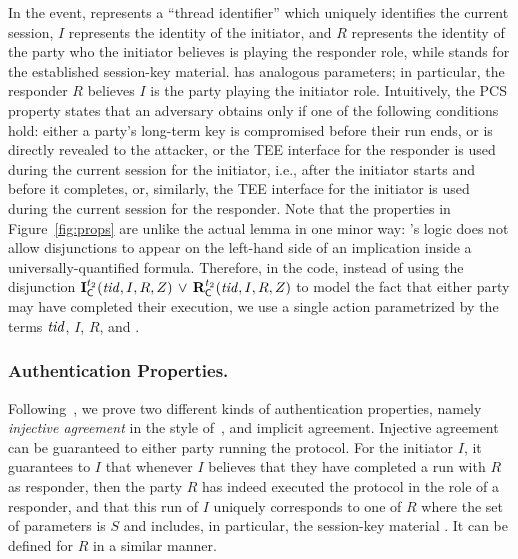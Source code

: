 \documentclass[runningheads]{llncs}
\begin{document}
In the \mIComplete{} event, \mTID{} represents a ``thread identifier'' which uniquely identifies the
current session, $I$ represents the identity of the initiator,
and $R$ represents the identity of the party who the initiator believes is
playing the responder role, while \mSessKey{} stands for the established
session-key material.
%
\mRComplete{} has analogous parameters; in particular, the responder $R$
believes $I$ is the party playing the initiator role.
%
Intuitively, the PCS property states that an adversary obtains \mSessKey{}
only if one of the following conditions hold: either a party's long-term key
is compromised before their run ends, or \mSessKey{} is directly revealed to
the attacker, or the TEE interface for the responder is used during the current
session for the initiator, i.e., after the initiator starts and before it
completes, or, similarly, the TEE interface for the initiator is used during the
current session for the responder.
%
Note that the properties in Figure~\ref{fig:props} are unlike the actual \mTamarin{} lemma in one minor way: \mTamarin's logic does not allow disjunctions to appear on
the left-hand side of an implication inside a universally-quantified formula.
%
Therefore, in the \mTamarin{} code, instead of using the disjunction
$\mathbf{I}_{\textsf{C}}^{t_2}(\mathit{tid}, I, R, Z)\, \lor\,
\mathbf{R}_{\textsf{C}}^{t_2}(\mathit{tid}, I, R, Z)$
to model the fact that either party may have completed their execution, we use
a single action parametrized by the terms $\mathit{tid}$, $I$, $R$, and \mSessKey.

\subsubsection{Authentication Properties.}
\label{sec:authenticationDef}
Following~\cite{Norr21}, we prove two different kinds of authentication
properties, namely \emph{injective agreement} in the style
of~\cite{DBLP:conf/csfw/Lowe97a}, and implicit agreement.
%
Injective agreement can be guaranteed to either party running the protocol.
%
For the initiator $I$, it guarantees to $I$ that whenever $I$ believes that
they have completed a run with $R$ as responder, then the party $R$ has 
indeed
executed the protocol in the role of a responder, and that this run of $I$
uniquely corresponds to one of $R$ where the set of parameters is $S$ and
includes, in particular, the session-key material \mSessKey{}.
%
It can be defined for $R$ in a similar manner.
\end{document}
